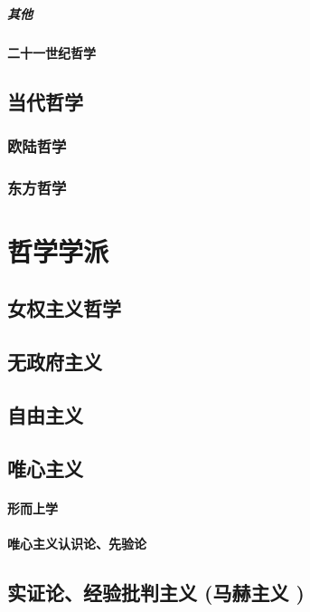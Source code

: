 \documentclass[UTF8]{../RepresentationUniverse}
\begin{document}
    \paragraph{其他}
\subsubsection{二十一世纪哲学}

    
\section{当代哲学}
    \subsection{欧陆哲学}
    \subsection{东方哲学}




\chapter{哲学学派}
  

    \section{女权主义哲学}
    \section{无政府主义}
    \section{自由主义}


    \section{唯心主义}
        \subsubsection{形而上学}
        \subsubsection{唯心主义认识论、先验论}

    \section{实证论、经验批判主义 (马赫主义 )}
\end{document}
